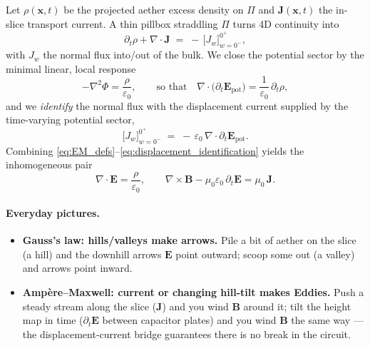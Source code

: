 Let $\rho(\mathbf x,t)$ be the projected aether excess density on $\Pi$ and $\mathbf J(\mathbf x,t)$ the in-slice transport current. A thin pillbox straddling $\Pi$ turns 4D continuity into
\begin{equation}
\partial_t \rho + \nabla\!\cdot\!\mathbf J \;=\; -\,\Big[J_w\Big]_{w=0^-}^{0^+},
\label{eq:slice_continuity}
\end{equation}
with $J_w$ the normal flux into/out of the bulk. We close the potential sector by the minimal linear, local response
\begin{equation}
-\nabla^2 \Phi = \frac{\rho}{\varepsilon_0},
\qquad
\text{so that}\quad
\nabla\!\cdot\!\big(\partial_t\mathbf E_{\text{pot}}\big)=\frac{1}{\varepsilon_0}\,\partial_t\rho,
\label{eq:closure}
\end{equation}
and we \emph{identify} the normal flux with the displacement current supplied by the time-varying potential sector,
\begin{equation}
\Big[J_w\Big]_{w=0^-}^{0^+} \;=\; -\,\varepsilon_0\,\nabla\!\cdot\!\partial_t\mathbf E_{\text{pot}}.
\label{eq:displacement_identification}
\end{equation}
Combining \eqref{eq:EM_defs}–\eqref{eq:displacement_identification} yields the inhomogeneous pair
\begin{equation}
\nabla\!\cdot\!\mathbf E = \frac{\rho}{\varepsilon_0},
\qquad
\nabla\times \mathbf B - \mu_0 \varepsilon_0\,\partial_t \mathbf E = \mu_0\,\mathbf J.
\label{eq:inhomogeneous}
\end{equation}

\paragraph{Everyday pictures.}
\begin{itemize}
  \item \textbf{Gauss's law: hills/valleys make arrows.} Pile a bit of aether on the slice (a hill) and the downhill arrows $\mathbf E$ point outward; scoop some out (a valley) and arrows point inward.
  \item \textbf{Amp\`ere–Maxwell: current or changing hill-tilt makes Eddies.} Push a steady stream along the slice ($\mathbf J$) and you wind $\mathbf B$ around it; tilt the height map in time ($\partial_t\mathbf E$ between capacitor plates) and you wind $\mathbf B$ the same way --- the displacement-current bridge guarantees there is no break in the circuit.
\end{itemize}

